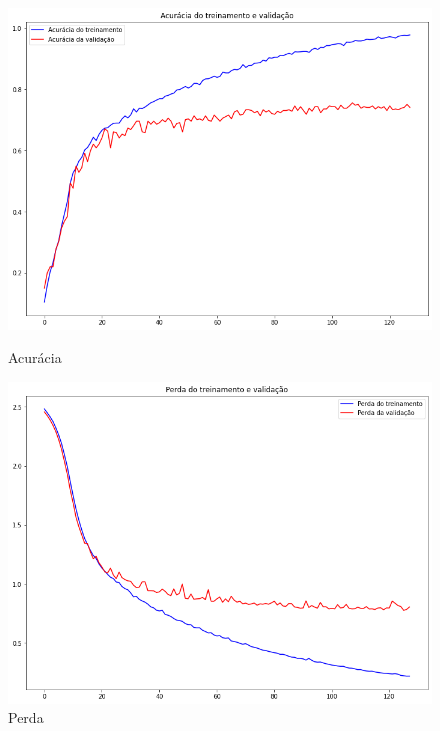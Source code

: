 \documentclass[12pt]{article}
\begin{document}
\begin{figure}[!htb]
  \begin{minipage}{.47\textwidth}
    \centering
    \includegraphics[width=1.1\linewidth]{experiments/lenet5_noaug_128/accuracy.png}
    \caption{Acurácia}\label{fig:experiment_lenet5_noaug_128_accuracy}
  \end{minipage}\hfill
  \begin{minipage}{.47\textwidth}
    \centering
    \includegraphics[width=1.1\linewidth]{experiments/lenet5_noaug_128/loss.png}
    \caption{Perda}\label{fig:experiment_lenet5_noaug_128_loss}
  \end{minipage}
\end{figure}
\end{document}
